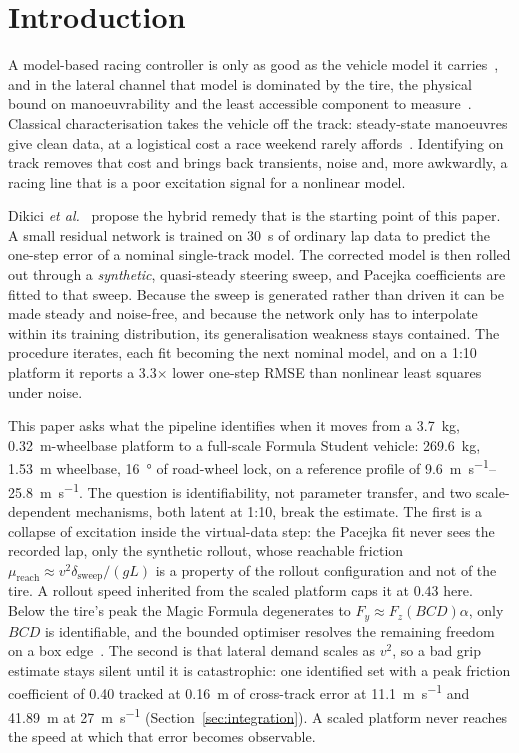 \section{Introduction}

A model-based racing controller is only as good as the vehicle model it
carries~\cite{kabzan2019lbmpc}, and in the lateral channel that model is
dominated by the tire, the physical bound on manoeuvrability and the least
accessible component to measure~\cite{pacejka2012book}. Classical
characterisation takes the vehicle off the track: steady-state manoeuvres give
clean data, at a logistical cost a race weekend rarely
affords~\cite{ontrack2025}. Identifying on track removes that cost and brings
back transients, noise and, more awkwardly, a racing line that is a poor
excitation signal for a nonlinear model.

Dikici \emph{et al.}~\cite{ontrack2025} propose the hybrid remedy that is the
starting point of this paper. A small residual network is trained on
\SI{30}{\second} of ordinary lap data to predict the one-step error of a
nominal single-track model. The corrected model is then rolled out through a
\emph{synthetic}, quasi-steady steering sweep, and Pacejka coefficients are
fitted to that sweep. Because the sweep is generated rather than driven it can
be made steady and noise-free, and because the network only has to interpolate
within its training distribution, its generalisation weakness stays contained.
The procedure iterates, each fit becoming the next nominal model, and on a 1:10
platform it reports a \num{3.3}$\times$ lower one-step RMSE than nonlinear
least squares under noise.

This paper asks what the pipeline identifies when it moves from a
\SI{3.7}{\kilo\gram}, \SI{0.32}{\meter}-wheelbase platform to a full-scale
Formula Student vehicle: \SI{269.6}{\kilo\gram}, \SI{1.53}{\meter} wheelbase,
\SI{16}{\degree} of road-wheel lock, on a reference profile of
\SIrange{9.6}{25.8}{\meter\per\second}. The question is identifiability, not
parameter transfer, and two scale-dependent mechanisms, both latent at 1:10,
break the estimate. The first is a collapse of excitation inside the
virtual-data step: the Pacejka fit never sees the recorded lap, only the
synthetic rollout, whose reachable friction
$\mu_{\mathrm{reach}}\!\approx\!v^{2}\delta_{\mathrm{sweep}}/(gL)$ is a
property of the rollout configuration and not of the tire. A rollout speed
inherited from the scaled platform caps it at $0.43$ here. Below the tire's
peak the Magic Formula degenerates to $F_{y}\approx F_{z}(BCD)\alpha$, only
$BCD$ is identifiable, and the bounded optimiser resolves the remaining freedom
on a box edge~\cite{ljung1999sysid}. The second is that lateral demand scales
as $v^{2}$, so a bad grip estimate stays silent until it is catastrophic: one
identified set with a peak friction coefficient of \num{0.40} tracked at
\SI{0.16}{\meter} of cross-track error at \SI{11.1}{\meter\per\second} and
\SI{41.89}{\meter} at \SI{27}{\meter\per\second}
(Section~\ref{sec:integration}). A scaled platform never reaches the speed at
which that error becomes observable.

